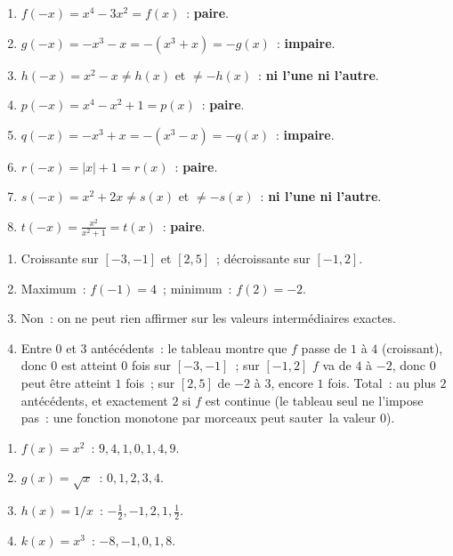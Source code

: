 \begin{enumerate}
  \item $f(-x)=x^4-3x^2=f(x)$~: \textbf{paire}.
  \item $g(-x)=-x^3-x=-(x^3+x)=-g(x)$~: \textbf{impaire}.
  \item $h(-x)=x^2-x\ne h(x)$ et $\ne-h(x)$~: \textbf{ni l'une ni l'autre}.
  \item $p(-x)=x^4-x^2+1=p(x)$~: \textbf{paire}.
  \item $q(-x)=-x^3+x=-(x^3-x)=-q(x)$~: \textbf{impaire}.
  \item $r(-x)=|x|+1=r(x)$~: \textbf{paire}.
  \item $s(-x)=x^2+2x\ne s(x)$ et $\ne-s(x)$~: \textbf{ni l'une ni l'autre}.
  \item $t(-x)=\frac{x^2}{x^2+1}=t(x)$~: \textbf{paire}.
\end{enumerate}


\begin{enumerate}
  \item Croissante sur $[-3,-1]$ et $[2,5]$~; d\'ecroissante sur $[-1,2]$.
  \item Maximum~: $f(-1)=4$~; minimum~: $f(2)=-2$.
  \item Non~: on ne peut rien affirmer sur les valeurs interm\'ediaires exactes.
  \item Entre $0$ et $3$ ant\'ec\'edents~: le tableau montre que $f$ passe de $1$ \`a $4$
        (croissant), donc $0$ est atteint 0 fois sur $[-3,-1]$~; sur $[-1,2]$ $f$ va de $4$ \`a $-2$,
        donc $0$ peut \^etre atteint $1$ fois~; sur $[2,5]$ de $-2$ \`a $3$, encore $1$ fois.
        Total~: au plus $2$ ant\'ec\'edents, et exactement $2$ si $f$ est continue (le tableau seul ne l'impose pas~: une fonction monotone par morceaux peut \og sauter\fg\ la valeur $0$).
\end{enumerate}


\begin{enumerate}
  \item $f(x)=x^2$~: $9,4,1,0,1,4,9$.
  \item $g(x)=\sqrt{x}$~: $0,1,2,3,4$.
  \item $h(x)=1/x$~: $-\frac{1}{2},-1,2,1,\frac{1}{2}$.
  \item $k(x)=x^3$~: $-8,-1,0,1,8$.
\end{enumerate}

